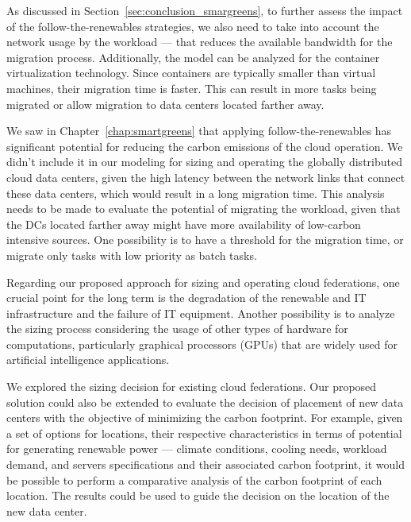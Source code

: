 \label{sec:conclusion_future_research}


As discussed in Section~\ref{sec:conclusion_smargreens}, to further assess the impact of the follow-the-renewables strategies, we also need to take into account the network usage by the workload --- that reduces the available bandwidth for the migration process. Additionally, the model can be analyzed for the container virtualization technology. Since containers are typically smaller than virtual machines, their migration time is faster. This can result in more tasks being migrated or allow migration to data centers located farther away.


We saw in Chapter~\ref{chap:smartgreens} that applying follow-the-renewables has significant potential for reducing the carbon emissions of the cloud operation. We didn't include it in our modeling for sizing and operating the globally distributed cloud data centers, given the high latency between the network links that connect these data centers, which would result in a long migration time. This analysis needs to be made to evaluate the potential of migrating the workload, given that the DCs located farther away might have more availability of low-carbon intensive sources. One possibility is to have a threshold for the migration time, or migrate only tasks with low priority as batch tasks.

Regarding our proposed approach for sizing and operating cloud federations, one crucial point for the long term is the degradation of the renewable and IT infrastructure and the failure of IT equipment. Another possibility is to analyze the sizing process considering the usage of other types of hardware for computations, particularly graphical processors (GPUs) that are widely used for artificial intelligence applications.

We explored the sizing decision for existing cloud federations. Our proposed solution could also be extended to evaluate the decision of placement of new data centers with the objective of minimizing the carbon footprint. For example, given a set of options for locations, their respective characteristics in terms of potential for generating renewable power --- climate conditions, cooling needs, workload demand, and servers specifications and their associated carbon footprint, it would be possible to perform a comparative analysis of the carbon footprint of each location. The results could be used to guide the decision on the location of the new data center.


